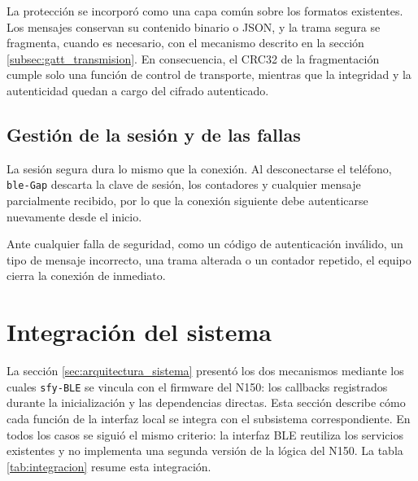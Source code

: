 La protección se incorporó como una capa común sobre los formatos existentes. Los mensajes conservan su contenido binario o JSON, y la trama segura se fragmenta, cuando es necesario, con el mecanismo descrito en la sección \ref{subsec:gatt_transmision}. En consecuencia, el CRC32 de la fragmentación cumple solo una función de control de transporte, mientras que la integridad y la autenticidad quedan a cargo del cifrado autenticado.

\subsection{Gestión de la sesión y de las fallas}
\label{subsec:auth_fallas}

La sesión segura dura lo mismo que la conexión. Al desconectarse el teléfono, \texttt{ble-Gap} descarta la clave de sesión, los contadores y cualquier mensaje parcialmente recibido, por lo que la conexión siguiente debe autenticarse nuevamente desde el inicio.

Ante cualquier falla de seguridad, como un código de autenticación inválido, un tipo de mensaje incorrecto, una trama alterada o un contador repetido, el equipo cierra la conexión de inmediato.


\section{Integración del sistema}
\label{sec:integracion}

La sección \ref{sec:arquitectura_sistema} presentó los dos mecanismos mediante los cuales \texttt{sfy-BLE} se vincula con el firmware del N150: los callbacks registrados durante la inicialización y las dependencias directas. Esta sección describe cómo cada función de la interfaz local se integra con el subsistema correspondiente. En todos los casos se siguió el mismo criterio: la interfaz BLE reutiliza los servicios existentes y no implementa una segunda versión de la lógica del N150. La tabla \ref{tab:integracion} resume esta integración.

